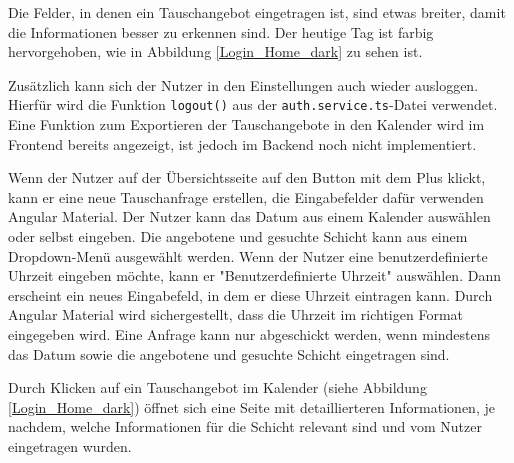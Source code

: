 Die Felder, in denen ein Tauschangebot eingetragen ist, sind etwas breiter, damit die Informationen besser zu erkennen sind. 
Der heutige Tag ist farbig hervorgehoben, wie in Abbildung \ref{Login_Home_dark} zu sehen ist.

Zusätzlich kann sich der Nutzer in den Einstellungen auch wieder ausloggen. Hierfür wird die Funktion \texttt{logout()} aus der \texttt{auth.service.ts}-Datei verwendet. 
Eine Funktion zum Exportieren der Tauschangebote in den Kalender wird im Frontend bereits angezeigt, ist jedoch im Backend noch nicht implementiert.

Wenn der Nutzer auf der Übersichtsseite auf den Button mit dem Plus klickt, kann er eine neue Tauschanfrage erstellen, die Eingabefelder dafür verwenden Angular Material. 
Der Nutzer kann das Datum aus einem Kalender auswählen oder selbst eingeben. Die angebotene und gesuchte Schicht kann aus einem Dropdown-Menü ausgewählt werden. 
Wenn der Nutzer eine benutzerdefinierte Uhrzeit eingeben möchte, kann er "Benutzerdefinierte Uhrzeit" auswählen. 
Dann erscheint ein neues Eingabefeld, in dem er diese Uhrzeit eintragen kann. Durch Angular Material wird sichergestellt, dass die Uhrzeit im richtigen Format eingegeben wird. 
Eine Anfrage kann nur abgeschickt werden, wenn mindestens das Datum sowie die angebotene und gesuchte Schicht eingetragen sind.

Durch Klicken auf ein Tauschangebot im Kalender (siehe Abbildung \ref{Login_Home_dark}) öffnet sich eine Seite mit detaillierteren Informationen, je nachdem, welche Informationen für die Schicht relevant sind und vom Nutzer eingetragen wurden.